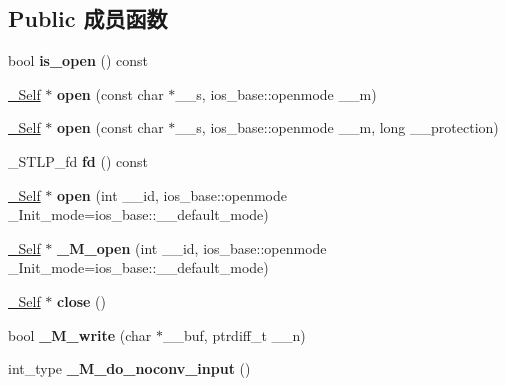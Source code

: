 \subsection*{Public 成员函数}
\begin{DoxyCompactItemize}
\item 
\mbox{\label{classbasic__filebuf_a6c69fa3a53435104373ebf2211c7a1a3}} 
bool {\bfseries is\+\_\+open} () const
\item 
\mbox{\label{classbasic__filebuf_af1a174958e24e2748fbb5a254d7b3148}} 
\hyperlink{classbasic__filebuf}{\+\_\+\+Self} $\ast$ {\bfseries open} (const char $\ast$\+\_\+\+\_\+s, ios\+\_\+base\+::openmode \+\_\+\+\_\+m)
\item 
\mbox{\label{classbasic__filebuf_a05ea2892041ccef5b23c1ffc6efd3ad9}} 
\hyperlink{classbasic__filebuf}{\+\_\+\+Self} $\ast$ {\bfseries open} (const char $\ast$\+\_\+\+\_\+s, ios\+\_\+base\+::openmode \+\_\+\+\_\+m, long \+\_\+\+\_\+protection)
\item 
\mbox{\label{classbasic__filebuf_a8b7d7519bcc893fa61dc10d079ed9953}} 
\+\_\+\+S\+T\+L\+P\+\_\+fd {\bfseries fd} () const
\item 
\mbox{\label{classbasic__filebuf_a7f0a2bc197c30eded9567583a7569801}} 
\hyperlink{classbasic__filebuf}{\+\_\+\+Self} $\ast$ {\bfseries open} (int \+\_\+\+\_\+id, ios\+\_\+base\+::openmode \+\_\+\+Init\+\_\+mode=ios\+\_\+base\+::\+\_\+\+\_\+default\+\_\+mode)
\item 
\mbox{\label{classbasic__filebuf_aeff6626edcf3586bb2498de78af65e6b}} 
\hyperlink{classbasic__filebuf}{\+\_\+\+Self} $\ast$ {\bfseries \+\_\+\+M\+\_\+open} (int \+\_\+\+\_\+id, ios\+\_\+base\+::openmode \+\_\+\+Init\+\_\+mode=ios\+\_\+base\+::\+\_\+\+\_\+default\+\_\+mode)
\item 
\mbox{\label{classbasic__filebuf_a4222f401473109df309e435779d9dc8d}} 
\hyperlink{classbasic__filebuf}{\+\_\+\+Self} $\ast$ {\bfseries close} ()
\item 
\mbox{\label{classbasic__filebuf_ac7a389d0e981ca7427cf99b72e3241dd}} 
bool {\bfseries \+\_\+\+M\+\_\+write} (char $\ast$\+\_\+\+\_\+buf, ptrdiff\+\_\+t \+\_\+\+\_\+n)
\item 
\mbox{\label{classbasic__filebuf_a8613e23a0fb1a813985bb2b9f0c67745}} 
int\+\_\+type {\bfseries \+\_\+\+M\+\_\+do\+\_\+noconv\+\_\+input} ()
\end{DoxyCompactItemize}
